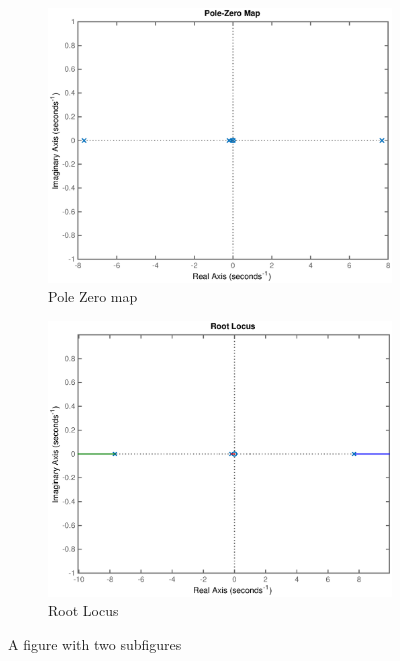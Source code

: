 \documentclass[a4paper,11pt]{kth-mag}
\begin{document}
\begin{figure}
\centering
\begin{subfigure}{.5\textwidth}
  \centering
  \includegraphics[width=\textwidth]{PzMap.eps}
  \caption{Pole Zero map}
  \label{Fig: PZmap}
\end{subfigure}%
\begin{subfigure}{.5\textwidth}
  \centering
  \includegraphics[width=\textwidth]{RootLocus.eps}
  \caption{Root Locus}
  \label{Fig: RootLocus}
\end{subfigure}
\caption{A figure with two subfigures}
\label{Fig: PZ & RootLocus}
\end{figure}
\end{document}
